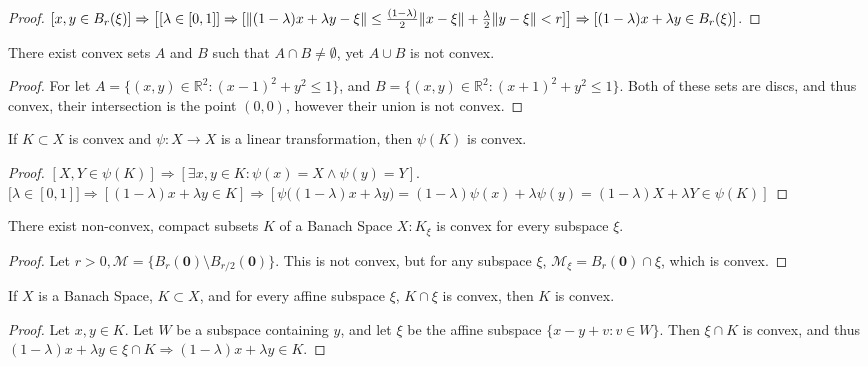 \documentclass[crop=false,class=book,oneside]{standalone}
\begin{document}
            \begin{proof}
            $[x,y\in B_{r}(\xi)]\Rightarrow\big[[\lambda \in [0,1]]\Rightarrow [\lVert(1-\lambda)x+\lambda y-\xi\rVert\leq \frac{(1-\lambda)}{2}\lVert x-\xi\rVert+\frac{\lambda}{2} \lVert y-\xi\rVert< r]\big]\Rightarrow [(1-\lambda)x+\lambda y \in B_{r}(\xi)]$.
            \end{proof}
            \begin{theorem}
            There exist convex sets $A$ and $B$ such that $A\cap B \ne \emptyset$, yet $A\cup B$ is not convex.
            \end{theorem}
            \begin{proof}
            For let $A = \{(x,y)\in \mathbb{R}^2: (x-1)^2+y^2\leq 1\}$, and $B = \{(x,y)\in \mathbb{R}^2:(x+1)^2+y^2\leq 1\}$. Both of these sets are discs, and thus convex, their intersection is the point $(0,0)$, however their union is not convex.
            \end{proof}
            \begin{theorem}
            If $K\subset X$ is convex and $\psi:X\rightarrow X$ is a linear transformation, then $\psi(K)$ is convex.
            \end{theorem}
            \begin{proof}
            $[X,Y\in \psi(K)]\Rightarrow [\exists x,y\in K:\psi(x)=X\land \psi(y)=Y]$. $\big[\lambda \in [0,1]\big]\Rightarrow [(1-\lambda)x+\lambda y\in K]\Rightarrow [\psi\big((1-\lambda)x+\lambda y\big)=(1-\lambda)\psi(x)+\lambda\psi(y) = (1-\lambda)X+\lambda Y \in \psi(K)]$
            \end{proof}
            \begin{theorem}
            There exist non-convex, compact subsets $K$ of a Banach Space $X: K_{\xi}$ is convex for every subspace $\xi$.
            \end{theorem}
            \begin{proof}
            Let $r>0, \mathcal{M} = \{B_{r}(\mathbf{0})\setminus B_{r/2}(\mathbf{0})\}$. This is not convex, but for any subspace $\xi$, $\mathcal{M}_{\xi} = B_{r}(\mathbf{0})\cap \xi$, which is convex.
            \end{proof}
            \begin{theorem}
            If $X$ is a Banach Space, $K\subset X$, and for every affine subspace $\xi$, $K\cap \xi$ is convex, then $K$ is convex.
            \end{theorem}
            \begin{proof}
            Let $x,y\in K$. Let $W$ be a subspace containing $y$, and let $\xi$ be the affine subspace $\{x-y+v:v\in W\}$. Then $\xi\cap K$ is convex, and thus $(1-\lambda)x+\lambda y \in \xi \cap K \Rightarrow (1-\lambda)x+\lambda y \in K$.
            \end{proof}
\end{document}
